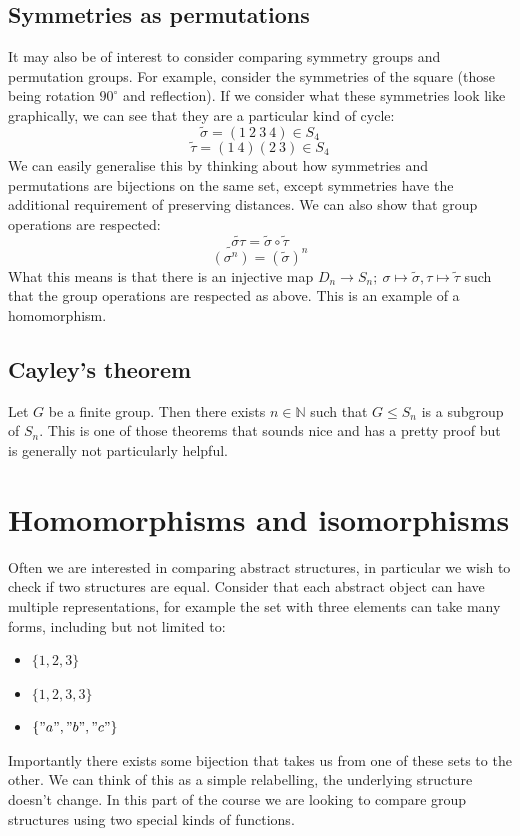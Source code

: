 \documentclass[12pt]{article}
\begin{document}
\subsection*{Symmetries as permutations}
It may also be of interest to consider comparing symmetry groups and permutation groups. For example, consider the symmetries of the square (those being rotation \(90^\circ\) and reflection). If we consider what these symmetries look like graphically, we can see that they are a particular kind of cycle:
\[\tilde{\sigma}=(1\ 2 \ 3\ 4)\in S_4\]
\[\tilde{\tau}=(1\ 4)(2\ 3)\in S_4\]
We can easily generalise this by thinking about how symmetries and permutations are bijections on the same set, except symmetries have the additional requirement of preserving distances. We can also show that group operations are respected:
\[\tilde{\sigma\tau}=\tilde{\sigma}\circ\tilde{\tau}\]
\[\tilde{(\sigma^n)}=(\tilde{\sigma})^n\]
What this means is that there is an injective map \(D_n\to S_n;\ \sigma\mapsto\tilde{\sigma}, \tau\mapsto\tilde{\tau}\) such that the group operations are respected as above. This is an example of a homomorphism.
\subsection*{Cayley's theorem}
Let \(G\) be a finite group. Then there exists \(n\in\mathbb{N}\) such that \(G\leqslant S_n\) is a subgroup of \(S_n\). This is one of those theorems that sounds nice and has a pretty proof but is generally not particularly helpful.
\section{Homomorphisms and isomorphisms}
Often we are interested in comparing abstract structures, in particular we wish to check if two structures are equal. Consider that each abstract object can have multiple representations, for example the set with three elements can take many forms, including but not limited to:
\begin{itemize}
    \item \(\{1,2,3\}\)
    \item \(\{1,2,3,3\}\)
    \item \(\{"a","b","c"\}\)
\end{itemize}
Importantly there exists some bijection that takes us from one of these sets to the other. We can think of this as a simple relabelling, the underlying structure doesn't change. In this part of the course we are looking to compare group structures using two special kinds of functions.
\end{document}
